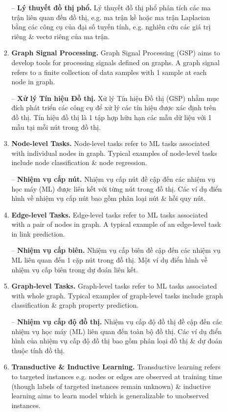 \documentclass{article}
\begin{document}
\begin{itemize}
\begin{itemize}
\begin{enumerate}
            -- {\bf Lý thuyết đồ thị phổ.} Lý thuyết đồ thị phổ phân tích các ma trận liên quan đến đồ thị, e.g. ma trận kề hoặc ma trận Laplacian bằng các công cụ của đại số tuyến tính, e.g. nghiên cứu các giá trị riêng \& vectơ riêng của ma trận.
            \item {\bf Graph Signal Processing.} Graph Signal Processing (GSP) aims to develop tools for processing signals defined on graphs. A graph signal refers to a finite collection of data samples with 1 sample at each node in graph.

            -- {\bf Xử lý Tín hiệu Đồ thị.} Xử lý Tín hiệu Đồ thị (GSP) nhằm mục đích phát triển các công cụ để xử lý các tín hiệu được xác định trên đồ thị. Tín hiệu đồ thị là 1 tập hợp hữu hạn các mẫu dữ liệu với 1 mẫu tại mỗi nút trong đồ thị.
            \item {\bf Node-level Tasks.} Node-level tasks refer to ML tasks associated with individual nodes in graph. Typical examples of node-level tasks include node classification \& node regression.

            -- {\bf Nhiệm vụ cấp nút.} Nhiệm vụ cấp nút đề cập đến các nhiệm vụ học máy (ML) được liên kết với từng nút trong đồ thị. Các ví dụ điển hình về nhiệm vụ cấp nút bao gồm phân loại nút \& hồi quy nút.
            \item {\bf Edge-level Tasks.} Edge-level tasks refer to ML tasks associated with a pair of nodes in graph. A typical example of an edge-level task in link prediction.

            -- {\bf Nhiệm vụ cấp biên.} Nhiệm vụ cấp biên đề cập đến các nhiệm vụ ML liên quan đến 1 cặp nút trong đồ thị. Một ví dụ điển hình về nhiệm vụ cấp biên trong dự đoán liên kết.
            \item {\bf Graph-level Tasks.} Graph-level tasks refer to ML tasks associated with whole graph. Typical examples of graph-level tasks include graph classification \& graph property prediction.

            -- {\bf Nhiệm vụ cấp độ đồ thị.} Nhiệm vụ cấp độ đồ thị đề cập đến các nhiệm vụ học máy (ML) liên quan đến toàn bộ đồ thị. Các ví dụ điển hình của nhiệm vụ cấp độ đồ thị bao gồm phân loại đồ thị \& dự đoán thuộc tính đồ thị.
            \item {\bf Transductive \& Inductive Learning.} Transductive learning refers to targeted instances e.g. nodes or edges are observed at training time (though labels of targeted instances remain unknown) \& inductive learning aims to learn model which is generalizable to unobserved instances.


\end{enumerate}
\end{itemize}
\end{itemize}
\end{document}
